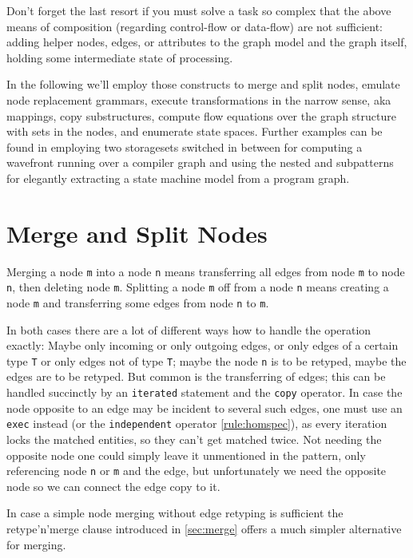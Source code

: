 \begin{note}
Don't forget the last resort if you must solve a task so complex that the above means of composition (regarding control-flow or data-flow) are not sufficient: adding helper nodes, edges, or attributes to the graph model and the graph itself, holding some intermediate state of processing. 
\end{note}

In the following we'll employ those constructs to merge and split nodes, emulate node replacement grammars, execute transformations in the narrow sense, aka mappings, copy substructures, compute flow equations over the graph structure with sets in the nodes, and enumerate state spaces.
Further examples can be found in \cite{CompilerOptimization} employing two storagesets switched in between for computing a wavefront running over a compiler graph and \cite{ProgramUnderstanding} using the nested and subpatterns for elegantly extracting a state machine model from a program graph.


\section{Merge and Split Nodes}
Merging a node \texttt{m} into a node \texttt{n} means transferring all edges from node \texttt{m} to node \texttt{n}, then deleting node \texttt{m}.
Splitting a node \texttt{m} off from a node \texttt{n} means creating a node \texttt{m} and transferring some edges from node \texttt{n} to \texttt{m}.

In both cases there are a lot of different ways how to handle the operation exactly:
Maybe only incoming or only outgoing edges, or only edges of a certain type \texttt{T} or only edges not of type \texttt{T}; maybe the node \texttt{n} is to be retyped, maybe the edges are to be retyped.
But common is the transferring of edges; this can be handled succinctly by an \texttt{iterated} statement and the \texttt{copy} operator.
In case the node opposite to an edge may be incident to several such edges, one must use an \texttt{exec} instead (or the \texttt{independent} operator \ref{rule:homspec}), as every iteration locks the matched entities, so they can't get matched twice. Not needing the opposite node one could simply leave it unmentioned in the pattern, only referencing node \texttt{n} or \texttt{m} and the edge, but unfortunately we need the opposite node so we can connect the edge copy to it.

\begin{note}
In case a simple node merging without edge retyping is sufficient the retype'n'merge clause introduced in \ref{sec:merge} offers a much simpler alternative for merging.
\end{note}

